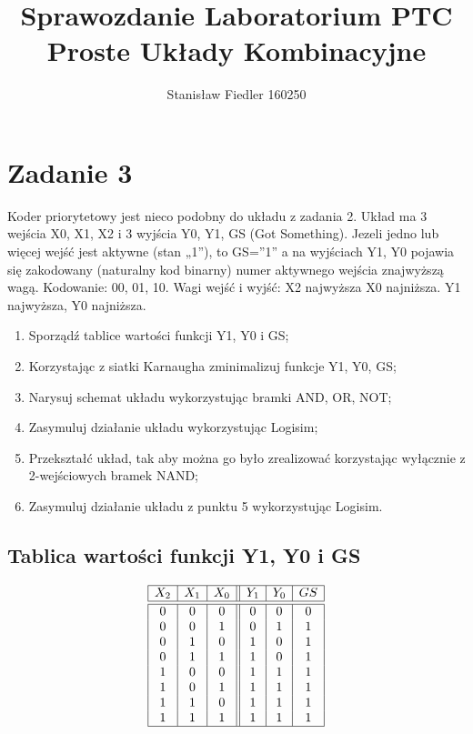 \documentclass[a4paper, 11pt]{article}
\title{%
       \large Sprawozdanie Laboratorium PTC \\
       \huge Proste Układy Kombinacyjne}
\author{Stanisław Fiedler 160250}
\begin{document}
\maketitle
\tableofcontents

\section{Zadanie 3}
Koder priorytetowy jest nieco podobny do układu z zadania 2.
Układ ma 3 wejścia X0, X1, X2 i 3 wyjścia Y0, Y1, GS (Got Something).
Jezeli jedno lub więcej wejść jest aktywne (stan „1”), to GS=”1” a na wyjściach Y1, Y0 pojawia się zakodowany (naturalny kod binarny) numer aktywnego wejścia znajwyższą wagą. Kodowanie: 00, 01, 10.
Wagi wejść i wyjść: X2 najwyższa X0 najniższa. Y1 najwyższa,
Y0 najniższa.

\begin{enumerate}
	\item Sporządź tablice wartości funkcji Y1, Y0 i GS;
	\item Korzystając z siatki Karnaugha zminimalizuj funkcje Y1, Y0, GS;
	\item Narysuj schemat układu wykorzystując bramki AND, OR, NOT;
	\item Zasymuluj działanie układu wykorzystując Logisim;
	\item Przekształć układ, tak aby można go było zrealizować korzystając wyłącznie z 2-wejściowych
	      bramek NAND;
	\item Zasymuluj działanie układu z punktu 5 wykorzystując Logisim.
\end{enumerate}

\subsection{Tablica wartości funkcji Y1, Y0 i GS}\label{sub:tablicawartosci} %

\begin{center}
	\[
		\begin{array}{ | c | c | c || c | c | c | }
			\hline
			X_2 & X_1 & X_0 & Y_1 & Y_0 & GS \\
			\hline\hline
			0   & 0   & 0   & 0   & 0   & 0  \\
			0   & 0   & 1   & 0   & 1   & 1  \\
			0   & 1   & 0   & 1   & 0   & 1  \\
			0   & 1   & 1   & 1   & 0   & 1  \\
			1   & 0   & 0   & 1   & 1   & 1  \\
			1   & 0   & 1   & 1   & 1   & 1  \\
			1   & 1   & 0   & 1   & 1   & 1  \\
			1   & 1   & 1   & 1   & 1   & 1  \\
			\hline
		\end{array}
	\]
\end{center}
\end{document}
